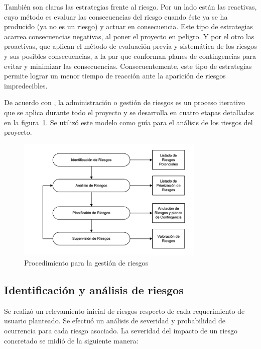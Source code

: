 		\par
     	También son claras las estrategias frente al riesgo. Por un lado están las reactivas, cuyo método es evaluar las consecuencias del riesgo cuando
 		éste ya se ha producido (ya no es un riesgo) y actuar en consecuencia. Este tipo de estrategias acarrea consecuencias negativas, al poner el
 		proyecto en peligro. Y por el otro las proactivas, que aplican el método de evaluación previa y sistemática de los riesgos y sus posibles
 		consecuencias, a la par que conforman planes de contingencias para evitar y minimizar las consecuencias. Consecuentemente, este tipo de
 		estrategias permite lograr un menor tiempo de reacción ante la aparición de riesgos impredecibles.
		\par
		De acuerdo con \cite{etiqueta_riegos3}, la administración o gestión de riesgos es un proceso iterativo que se aplica durante todo el proyecto y se
		desarrolla en cuatro etapas detalladas en la figura~\ref{fig:riesgos}. Se utilizó este modelo como guía para el análisis de los riesgos del
		proyecto.
		
		\begin{figure}[!h]
 		\begin{center}
  		\includegraphics[width=0.8\textwidth,keepaspectratio=true]{./images/riesgos}
  		\caption{Procedimiento para la gestión de riesgos}
  		\label{fig:riesgos}
 		\end{center}
		\end{figure}
		
		\subsection{Identificación y análisis de riesgos}
		\par
		Se realizó un relevamiento inicial de riesgos respecto de cada requerimiento de usuario planteado. Se efectuó un análisis de severidad y
		probabilidad de ocurrencia para cada riesgo asociado. La severidad del	impacto	de un riesgo concretado	se midió de la siguiente
		manera:
		
